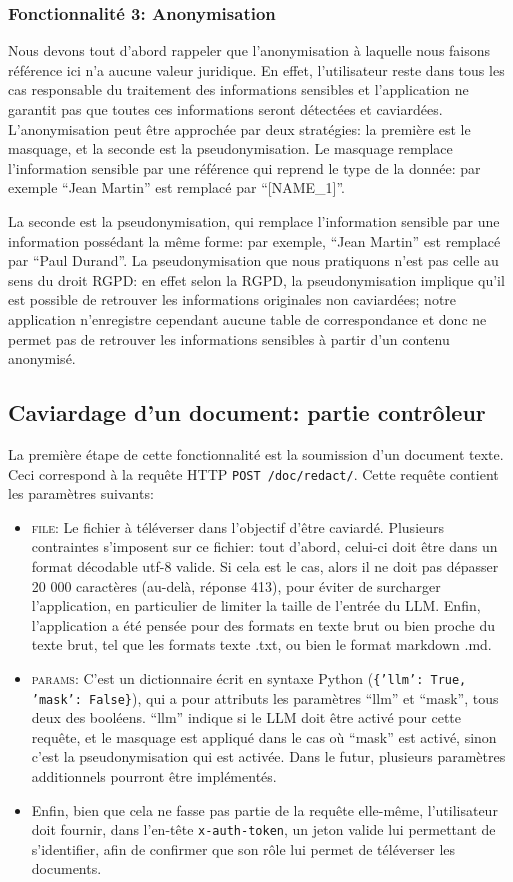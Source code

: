 \documentclass[12pt,a4paper]{article}
\begin{document}
\subsubsection{Fonctionnalité 3: Anonymisation}

Nous devons tout d'abord rappeler que l'anonymisation à laquelle nous faisons référence ici n'a aucune valeur juridique. En effet, l'utilisateur reste dans tous les cas responsable du traitement des informations sensibles et l'application ne garantit pas que toutes ces informations seront détectées et caviardées. 
L'anonymisation peut être approchée par deux stratégies: la première est le masquage, et la seconde est la pseudonymisation. Le masquage remplace l'information sensible par une référence qui reprend le type de la donnée: par exemple “Jean Martin” est remplacé par “[NAME\_1]”. 

La seconde est la pseudonymisation, qui remplace l'information sensible par une information possédant la même forme: par exemple, “Jean Martin” est remplacé par “Paul Durand”. La pseudonymisation que nous pratiquons n'est pas celle au sens du droit RGPD: en effet selon la RGPD, la pseudonymisation implique qu'il est possible de retrouver les informations originales non caviardées; notre application n'enregistre cependant aucune table de correspondance et donc ne permet pas de retrouver les informations sensibles à partir d’un contenu anonymisé.


\subsection{Caviardage d’un document: partie contrôleur}
La première étape de cette fonctionnalité est la soumission d’un document texte. Ceci correspond à la requête HTTP \texttt{POST /doc/redact/}. Cette requête contient les paramètres suivants:
\begin{itemize}
\item \textsc{file}: Le fichier à téléverser dans l’objectif d’être caviardé. Plusieurs contraintes s’imposent sur ce fichier: tout d’abord, celui-ci doit être dans un format décodable utf-8 valide. Si cela est le cas, alors il ne doit pas dépasser 20 000 caractères (au-delà, réponse 413), pour éviter de surcharger l’application, en particulier de limiter la taille de l’entrée du LLM. Enfin, l’application a été pensée pour des formats en texte brut ou bien proche du texte brut, tel que les formats texte .txt, ou bien le format markdown .md.
\item \textsc{params}: C’est un dictionnaire écrit en syntaxe Python (\texttt{\{'llm': True, 'mask': False\}}), qui a pour attributs les paramètres “llm” et “mask”, tous deux des booléens. “llm” indique si le LLM doit être activé pour cette requête, et le masquage est appliqué dans le cas où “mask” est activé, sinon c’est la pseudonymisation qui est activée. Dans le futur, plusieurs paramètres additionnels pourront être implémentés. 
\item Enfin, bien que cela ne fasse pas partie de la requête elle-même, l'utilisateur doit fournir, dans l'en-tête \texttt{x-auth-token}, un jeton valide lui permettant de s'identifier, afin de confirmer que son rôle lui permet de téléverser les documents.
\end{itemize}
\end{document}
